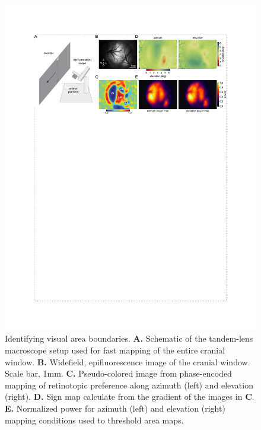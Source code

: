 \begin{figure}
    \includegraphics[width=\textwidth]{figures/chapter_2/fig_2-5_retino_mapping/fig_2-5_retino_mapping.pdf}
    \vspace{.1in}
    \caption[Wide-field mapping]{Identifying visual area boundaries. \textbf{A.} Schematic of the tandem-lens macroscope setup used for fast mapping of the entire cranial window. \textbf{B.} Widefield, epifluorescence image of the cranial window. Scale bar, 1mm. \textbf{C.} Pseudo-colored image from phase-encoded mapping of retinotopic preference along azimuth (left) and elevation (right). \textbf{D.} Sign map calculate from the gradient of the images in \textbf{C}. \textbf{E.} Normalized power for azimuth (left) and elevation (right) mapping conditions used to threshold area maps. 
    \label{fig:retino_mapping}}
\end{figure}

